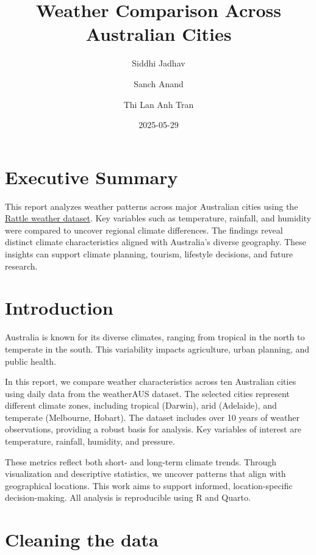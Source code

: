 \documentclass[
  letterpaper,
  DIV=11,
  numbers=noendperiod]{scrartcl}
\title{Weather Comparison Across Australian Cities}
\author{Siddhi Jadhav \and Sanch Anand \and Thi Lan Anh Tran}
\date{2025-05-29}
\renewcommand*\contentsname{Table of contents}
\newcommand\contentsname{Table of contents}
\begin{document}
\maketitle

\renewcommand*\contentsname{Table of Contents}
{
\hypersetup{linkcolor=}
\setcounter{tocdepth}{2}
\tableofcontents
}

\newpage

\section{Executive Summary}\label{executive-summary}

This report analyzes weather patterns across major Australian cities
using the
\href{https://www.kaggle.com/datasets/jsphyg/weather-dataset-rattle-package/data}{Rattle
weather dataset}. Key variables such as temperature, rainfall, and
humidity were compared to uncover regional climate differences. The
findings reveal distinct climate characteristics aligned with
Australia's diverse geography. These insights can support climate
planning, tourism, lifestyle decisions, and future research.

\section{Introduction}\label{introduction}

Australia is known for its diverse climates, ranging from tropical in
the north to temperate in the south. This variability impacts
agriculture, urban planning, and public health.

In this report, we compare weather characteristics across ten Australian
cities using daily data from the weatherAUS dataset. The selected cities
represent different climate zones, including tropical (Darwin), arid
(Adelaide), and temperate (Melbourne, Hobart). The dataset includes over
10 years of weather observations, providing a robust basis for analysis.
Key variables of interest are temperature, rainfall, humidity, and
pressure.

These metrics reflect both short- and long-term climate trends. Through
visualization and descriptive statistics, we uncover patterns that align
with geographical locations. This work aims to support informed,
location-specific decision-making. All analysis is reproducible using R
and Quarto.

\section{Cleaning the data}\label{cleaning-the-data}
\end{document}
